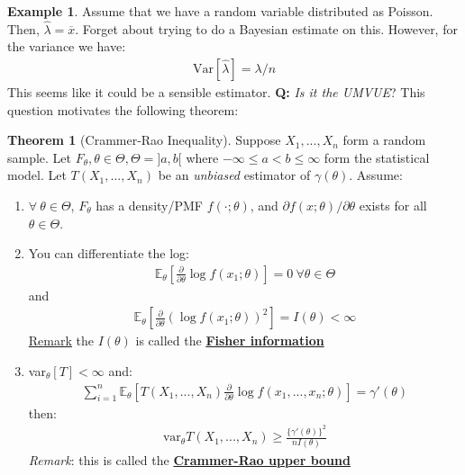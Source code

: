 \documentclass[11pt]{scrartcl}
\theoremstyle{definition}
\newtheorem{theorem}{Theorem}
\newtheorem{ex}{Example}
\theoremstyle{remark}
\newcommand{\dfn}[1]{\textbf{\underline{#1}}}
\newcommand{\EXth}[1]{\mathbb{E}_\theta \left[ #1 \right]}
\begin{document}
\begin{ex} 
Assume that we have a random variable distributed as Poisson. Then, $\hat{\lambda} = \overline{x}$. Forget about trying to do a Bayesian estimate on this. However, for the variance we have: 
	\begin{align*}
		\text{Var}[\hat{\lambda}] = \lambda / n 
	\end{align*}
	This seems like it could be a sensible estimator. \textbf{Q:} \emph{Is it the UMVUE}? This question motivates the following theorem: 
\end{ex}

\begin{theorem}[Crammer-Rao Inequality]
	Suppose $X_1, ..., X_n$ form a random sample. Let $F_\theta, \theta \in \Theta, \Theta = ]a,b[$ where $-\infty \leq a < b \leq \infty$ form the statistical model. Let $T(X_1, ..., X_n)$ be an \emph{unbiased} estimator of $\gamma(\theta)$. Assume: 
	\begin{enumerate}[noitemsep]
		\item $\forall\ \theta \in \Theta$, $F_\theta$ has a density/PMF $f(\cdot; \theta)$, and $\partial f(x; \theta) / \partial \theta$ exists for all $\theta \in \Theta$. 
		\item You can differentiate the log: 
		\begin{align*}
			\EXth{\frac{\partial}{\partial \theta} \log f(x_1; \theta)} = 0\ \forall \theta \in \Theta 	
		\end{align*}
		and 
		\begin{align*}
			\EXth{\frac{\partial}{\partial \theta} \left(  \log f(x_1; \theta) \right)^2 } = I(\theta) < \infty 	
		\end{align*}
		\underline{Remark} the $I(\theta)$ is called the \dfn{Fisher information}
		\item var$_\theta[T] < \infty$ and: 
		\begin{align*}
			\sum_{i=1}^n \EXth{T(X_1, ..., X_n) \frac{\partial}{\partial \theta} \log f(x_1, ..., x_n; \theta)} = \gamma'(\theta)  
		\end{align*}
		then: 
		\begin{align*}	
			\text{var}_\theta T(X_1, ..., X_n) \geq \frac{\{ \gamma'(\theta) \}^2}{nI(\theta)}	
		\end{align*}
		\emph{Remark}: this is called the \dfn{Crammer-Rao upper bound} 
	\end{enumerate}
\end{theorem}
\end{document}
